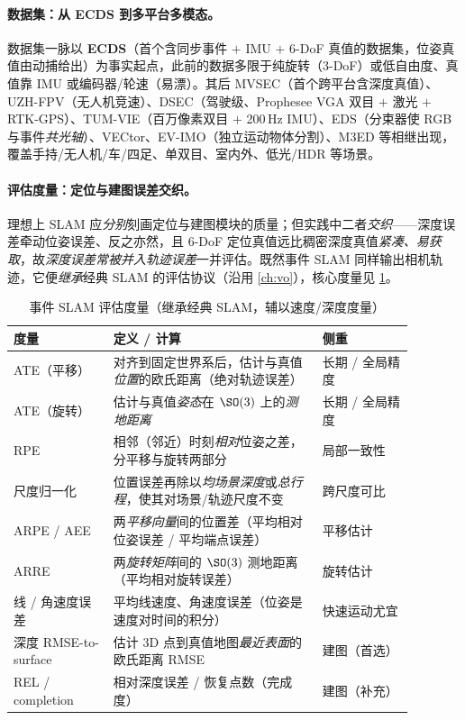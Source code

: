 \paragraph{数据集：从 ECDS 到多平台多模态。}
数据集一脉以 \textbf{ECDS}\cite{mueggler2017ecds}（首个含同步事件 $+$ IMU $+$ 6-DoF 真值的数据集，位姿真值由动捕给出）为事实起点，此前的数据多限于纯旋转（3-DoF）或低自由度、真值靠 IMU 或编码器/轮速（易漂）。其后 MVSEC（首个跨平台含深度真值）、UZH-FPV（无人机竞速）、DSEC（驾驶级、Prophesee VGA 双目 $+$ 激光 $+$ RTK-GPS）、TUM-VIE（百万像素双目 $+$ 200\,Hz IMU）、EDS（分束器使 RGB 与事件\emph{共光轴}）、VECtor、EV-IMO（独立运动物体分割）、M3ED 等相继出现，覆盖手持/无人机/车/四足、单双目、室内外、低光/HDR 等场景\cite{gallego2022eventsurvey,carlone2026handbook}。

\paragraph{评估度量：定位与建图误差交织。}
理想上 SLAM 应\emph{分别}刻画定位与建图模块的质量；但实践中二者\emph{交织}——深度误差牵动位姿误差、反之亦然，且 6-DoF 定位真值远比稠密深度真值\emph{紧凑、易获取}，故\emph{深度误差常被并入轨迹误差}一并评估\cite{carlone2026handbook}。既然事件 SLAM 同样输出相机轨迹，它便\emph{继承}经典 SLAM 的评估协议（沿用 \cref{ch:vo}），核心度量见 \cref{tab:event-metrics}。

\begin{table}[H]\centering\small
\caption{事件 SLAM 评估度量（继承经典 SLAM，辅以速度/深度度量）}
\label{tab:event-metrics}
\begin{tabular}{p{0.22\linewidth}p{0.46\linewidth}p{0.20\linewidth}}
\toprule
度量 & 定义 / 计算 & 侧重 \\
\midrule
ATE（平移）& 对齐到固定世界系后，估计与真值\emph{位置}的欧氏距离（绝对轨迹误差）& 长期 / 全局精度 \\
ATE（旋转）& 估计与真值\emph{姿态}在 $\SO(3)$ 上的\emph{测地距离} & 长期 / 全局精度 \\
RPE & 相邻（邻近）时刻\emph{相对}位姿之差，分平移与旋转两部分 & 局部一致性 \\
尺度归一化 & 位置误差再除以\emph{均场景深度}或\emph{总行程}，使其对场景/轨迹尺度不变 & 跨尺度可比 \\
ARPE / AEE & 两\emph{平移向量}间的位置差（平均相对位姿误差 / 平均端点误差）& 平移估计 \\
ARRE & 两\emph{旋转矩阵}间的 $\SO(3)$ 测地距离（平均相对旋转误差）& 旋转估计 \\
线 / 角速度误差 & 平均线速度、角速度误差（位姿是速度对时间的积分）& 快速运动尤宜 \\
深度 RMSE-to-surface & 估计 3D 点到真值地图\emph{最近表面}的欧氏距离 RMSE & 建图（首选）\\
REL / completion & 相对深度误差 / 恢复点数（完成度）& 建图（补充）\\
\bottomrule
\end{tabular}
\end{table}


